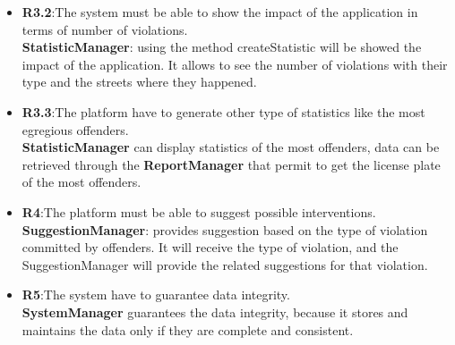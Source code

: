 \begin{itemize}
	\item 
	\textbf{R3.2}:The system must be able to show the impact of the application in terms of number of violations. \\
	\textbf{StatisticManager}: using the method createStatistic will be showed the impact of the application. It allows to see the number of violations with their type and the streets where they happened.
	
	\item 
	\textbf{R3.3}:The platform have to generate other type of statistics like the most egregious offenders. \\
	\textbf{StatisticManager} can display statistics of the most offenders, data can be retrieved through the \textbf{ReportManager} that permit to get the license plate of the most offenders.
	
	
	\item 
	\textbf{R4}:The platform must be able to suggest possible interventions. \\
	\textbf{SuggestionManager}: provides suggestion based on the type of violation committed by offenders. It will receive the type of violation, and the SuggestionManager will provide the related suggestions for that violation.
	
	\item 
	\textbf{R5}:The system have to guarantee data integrity. \\ 
	\textbf{SystemManager} guarantees the data integrity, because it stores and maintains the data only if they are complete and consistent.
	
	
	
	
	
\end{itemize}